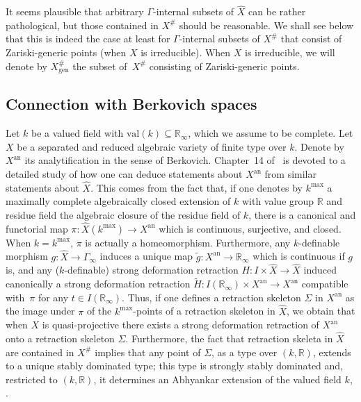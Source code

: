 \documentclass[JEP,XML,SOM,Unicode,ThmDefs,NoEqCountersInSection,published]{cedram}
\newcommand{\val}{\mathrm{val}}
\newcommand{\R}{\mathbb R}
\theoremstyle{plain}
\theoremstyle{definition}
\begin{document}
It seems plausible that arbitrary $\Gamma$-internal subsets of $\widehat X$ can be rather pathological, but those contained
in $X^{\#}$ should be reasonable. We shall see below that this is indeed the case at least
for $\Gamma$-internal subsets of $X^{\#}$
that consist of Zariski-generic points (when $X$ is irreducible).
When $X$ is irreducible, we will denote by
$X^{\#}_{\mathrm{gen}}$ the subset of~$X^{\#}$ consisting of Zariski-generic points.

\subsection{Connection with Berkovich spaces}

Let $k$ be a valued field with \hbox{$\val (k) \!\subseteq\! \R_\infty$}, which we assume to be complete.
Let $X$ be a separated and reduced algebraic variety of finite type over $k$.
Denote by $X^{\mathrm{an}}$ its analytification in the sense of Berkovich.
Chapter~14 of~\cite{HL} is devoted to a detailed study of how one can deduce statements about
$X^{\mathrm{an}}$ from similar statements about $\widehat{X}$.
This comes from the fact that, if one denotes by $k^{\mathrm{max}}$ a
maximally complete algebraically closed extension of $k$ with value group $\R$ and residue field the algebraic closure of the residue field of $k$,
there is a canonical and functorial
map
$\pi: \widehat{X}(k^{\mathrm{max}}) \to X^{\mathrm{an}}$ which is continuous, surjective, and closed. When $k = k^{\mathrm{max}}$, $\pi$ is actually a homeomorphism.
Furthermore, any $k$-definable
morphism $g: \widehat{X} \to \Gamma_\infty$ induces a unique map
$\tilde g: X^{\mathrm{an}} \to \R_\infty$ which is continuous if $g$ is, and
any ($k$-definable) strong deformation retraction
$H: I \times \widehat{X} \rightarrow \widehat{X}$
induced canonically a
strong deformation retraction
$\tilde H: I (\R_\infty) \times X^{\mathrm{an}} \rightarrow X^{\mathrm{an}}$
compatible with~$\pi$ for any $t \in I (\R_\infty)$.
Thus, if one defines a retraction skeleton $\Sigma$ in
$X^{\mathrm{an}}$ as the image under $\pi $ of the $k^{\mathrm{max}}$-points of a retraction skeleton in
$\widehat{X}$, we obtain that when $X$ is quasi-projective there exists a
strong deformation retraction of
$X^{\mathrm{an}}$ onto a retraction skeleton $\Sigma$. Furthermore,
the fact that retraction skeleta in $\widehat{X}$ are contained in $X^{\#}$
implies that
any point of $\Sigma$, as a type over $(k, \R)$, extends to a unique stably dominated type; this type is strongly stably dominated and, restricted to $(k, \R)$, it determines an Abhyankar extension of the valued field $k$, \cf \cite[Th.\,14.2.1]{HL}.
\end{document}
